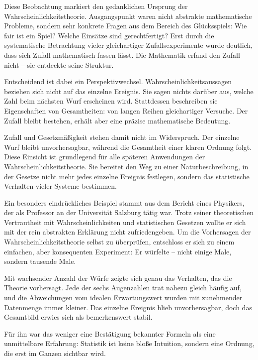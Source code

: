 Diese Beobachtung markiert den gedanklichen Ursprung der Wahrscheinlichkeitstheorie.
Ausgangspunkt waren nicht abstrakte mathematische Probleme,
sondern sehr konkrete Fragen aus dem Bereich des Glücksspiels:
Wie fair ist ein Spiel?
Welche Einsätze sind gerechtfertigt?
Erst durch die systematische Betrachtung vieler gleichartiger Zufallsexperimente
wurde deutlich,
dass sich Zufall mathematisch fassen lässt.
Die Mathematik erfand den Zufall nicht --
sie entdeckte seine Struktur.

Entscheidend ist dabei ein Perspektivwechsel.
Wahrscheinlichkeitsaussagen beziehen sich nicht auf das einzelne Ereignis.
Sie sagen nichts darüber aus,
welche Zahl beim nächsten Wurf erscheinen wird.
Stattdessen beschreiben sie Eigenschaften von Gesamtheiten:
von langen Reihen gleichartiger Versuche.
Der Zufall bleibt bestehen,
erhält aber eine präzise mathematische Bedeutung.

Zufall und Gesetzmäßigkeit stehen damit nicht im Widerspruch.
Der einzelne Wurf bleibt unvorhersagbar,
während die Gesamtheit einer klaren Ordnung folgt.
Diese Einsicht ist grundlegend
für alle späteren Anwendungen der Wahrscheinlichkeitstheorie.
Sie bereitet den Weg zu einer Naturbeschreibung,
in der Gesetze nicht mehr jedes einzelne Ereignis festlegen,
sondern das statistische Verhalten vieler Systeme bestimmen.

Ein besonders eindrückliches Beispiel stammt aus dem Bericht eines Physikers,
der als Professor an der Universität Salzburg tätig war.
Trotz seiner theoretischen Vertrautheit mit Wahrscheinlichkeiten
und statistischen Gesetzen
wollte er sich mit der rein abstrakten Erklärung nicht zufriedengeben.
Um die Vorhersagen der Wahrscheinlichkeitstheorie selbst zu überprüfen,
entschloss er sich zu einem einfachen,
aber konsequenten Experiment:
Er würfelte -- nicht einige Male,
sondern tausende Male.

Mit wachsender Anzahl der Würfe
zeigte sich genau das Verhalten,
das die Theorie vorhersagt.
Jede der sechs Augenzahlen trat nahezu gleich häufig auf,
und die Abweichungen vom idealen Erwartungswert
wurden mit zunehmender Datenmenge immer kleiner.
Das einzelne Ereignis blieb unvorhersagbar,
doch das Gesamtbild erwies sich als bemerkenswert stabil.

Für ihn war das weniger eine Bestätigung bekannter Formeln
als eine unmittelbare Erfahrung:
Statistik ist keine bloße Intuition,
sondern eine Ordnung,
die erst im Ganzen sichtbar wird.

